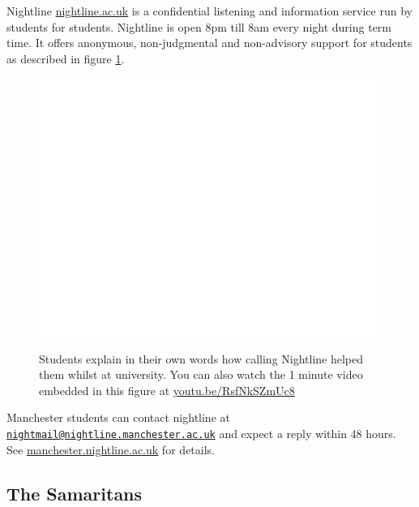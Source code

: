 \documentclass[
]{book}
\begin{document}
Nightline \href{https://www.nightline.ac.uk}{nightline.ac.uk} is a confidential listening and information service run by students for students. Nightline is open 8pm till 8am every night during term time. It offers anonymous, non-judgmental and non-advisory support for students as described in figure \ref{fig:nightline-fig}.

\begin{figure}

{\centering \href{https://www.youtube.com/embed/RsfNkSZmUc8}{\includegraphics[width=0.99\linewidth]{cdyf_files/figure-latex/nightline-fig-1} }

}

\caption{Students explain in their own words how calling Nightline helped them whilst at university. You can also watch the 1 minute video embedded in this figure at \href{https://youtu.be/RsfNkSZmUc8}{youtu.be/RsfNkSZmUc8} \citep{youtube-nightline}}\label{fig:nightline-fig}
\end{figure}



Manchester students can contact nightline at \href{mailto:nightmail@nightline.manchester.ac.uk}{\nolinkurl{nightmail@nightline.manchester.ac.uk}} and expect a reply within 48 hours. See \href{https://manchester.nightline.ac.uk/}{manchester.nightline.ac.uk} for details.

\hypertarget{samaritans}{%
\subsection{The Samaritans}\label{samaritans}}
\end{document}
